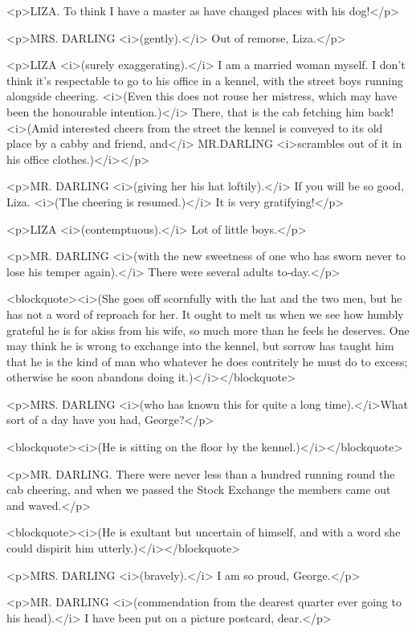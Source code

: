 <p>LIZA. To think I have a master as have changed places with his dog!</p>

<p>MRS. DARLING <i>(gently).</i> Out of remorse, Liza.</p>

<p>LIZA <i>(surely exaggerating).</i> I am a married woman myself. I don't think it's respectable to go to his office in a kennel, with the street boys running alongside cheering. <i>(Even this does not rouse her mistress, which may have been the honourable intention.)</i> There, that is the cab fetching him back! <i>(Amid interested cheers from the street the kennel is conveyed to its old place by a cabby and friend, and</i> MR.DARLING <i>scrambles out of it in his office clothes.)</i></p>

<p>MR. DARLING <i>(giving her his hat loftily).</i> If you will be so good, Liza. <i>(The cheering is resumed.)</i> It is very gratifying!</p>

<p>LIZA <i>(contemptuous).</i> Lot of little boys.</p>

<p>MR. DARLING <i>(with the new sweetness of one who has sworn never to lose his temper again).</i> There were several adults to-day.</p>

<blockquote><i>(She goes off scornfully with the hat and the two men, but he has not a word of reproach for her. It ought to melt us when we see how humbly grateful he is for akiss from his wife, so much more than he feels he deserves. One may think he is wrong to exchange into the kennel, but sorrow has taught him that he is the kind of man who whatever he does contritely he must do to excess; otherwise he soon abandons doing it.)</i></blockquote>

<p>MRS. DARLING <i>(who has known this for quite a long time).</i>What sort of a day have you had, George?</p>

<blockquote><i>(He is sitting on the floor by the kennel.)</i></blockquote>

<p>MR. DARLING. There were never less than a hundred running round the cab cheering, and when we passed the Stock Exchange the members came out and waved.</p>

<blockquote><i>(He is exultant but uncertain of himself, and with a word she could dispirit him utterly.)</i></blockquote>

<p>MRS. DARLING <i>(bravely).</i> I am so proud, George.</p>

<p>MR. DARLING <i>(commendation from the dearest quarter ever going to his head).</i> I have been put on a picture postcard, dear.</p>

